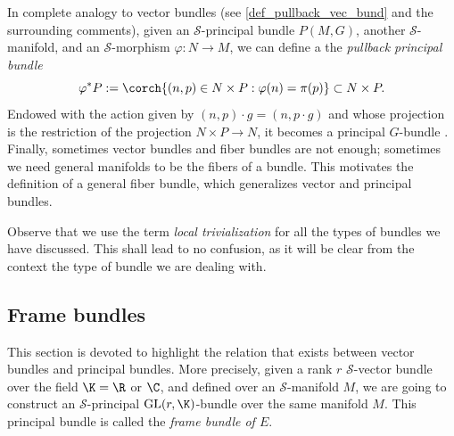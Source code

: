 In complete analogy to vector bundles (see \eqref{def_pullback_vec_bund} and the surrounding comments), given an \(\mathcal{S}\)-principal bundle \(P(M,G)\), another \(\mathcal{S}\)-manifold, and an \(\mathcal{S}\)-morphism \(\varphi\colon N\to M\), we can define a the \textit{pullback principal bundle}
\begin{equation} \label{eq_def_pullback}
\varphi^* P:=\corch{(n,p)\in N \times P: \varphi(n)=\pi(p)} \subset N \times P.
\end{equation}
Endowed with the action given by \((n, p)\cdot g=(n, p\cdot g)\) and whose projection is the restriction of the projection \(N \times P \to N\), it becomes a principal \(G\)-bundle \parencite[Remark 1.1.9]{Rudolph_2017pug}. \\

Finally, sometimes vector bundles and fiber bundles are not enough; sometimes we need general manifolds to be the fibers of a bundle. This motivates the definition of a general fiber bundle, which generalizes vector and principal bundles.


Observe that we use the term \textit{local trivialization} for all the types of bundles we have discussed. This shall lead to no confusion, as it will be clear from the context the type of bundle we are dealing with. \\

\subsection{Frame bundles} \label{section_frame_bundle}
This section is devoted to highlight the relation that exists between vector bundles and principal bundles. More precisely, given a rank \(r\) \(\mathcal{S}\)-vector bundle over the field \(\K=\R\) or \(\C\), and defined over an \(\mathcal{S}\)-manifold \(M\), we are going to construct an \(\mathcal{S}\)-principal \(\mathrm{GL}(r, \K)\)-bundle over the same manifold \(M\). This principal bundle is called the \textit{frame bundle of \(E\)}.  \\

